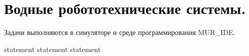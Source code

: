 \chapter{Водные робототехнические системы.}

Задачи выполняются в симуляторе и среде программирования MUR\_IDE.

{statement}
{statement}
{statement}